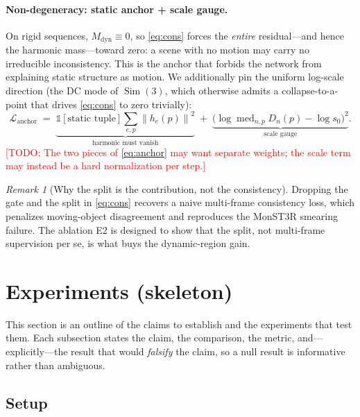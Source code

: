 \documentclass{article}
\DeclareMathOperator{\Sim}{Sim}
\newcommand{\norm}[1]{\left\lVert #1 \right\rVert}
\newcommand{\Mdyn}{M_{\mathrm{dyn}}}
\newcommand{\Lanchor}{\mathcal{L}_{\mathrm{anchor}}}
\newcommand{\todo}[1]{\textcolor{red}{[TODO: #1]}}
\theoremstyle{definition}
\theoremstyle{plain}
\theoremstyle{remark}
\newtheorem{remark}{Remark}
\begin{document}
\paragraph{Non-degeneracy: static anchor + scale gauge.}
On rigid sequences, $\Mdyn\equiv 0$, so \eqref{eq:cons} forces the
\emph{entire} residual---and hence the harmonic mass---toward zero: a
scene with no motion may carry no irreducible inconsistency. This is the
anchor that forbids the network from explaining static structure as
motion. We additionally pin the uniform log-scale direction (the DC mode
of $\Sim(3)$, which otherwise admits a collapse-to-a-point that drives
\eqref{eq:cons} to zero trivially):
\begin{equation}
  \Lanchor
  \;=\;
  \underbrace{\mathbb{1}[\text{static tuple}]\sum_{e,p}\norm{h_e(p)}^2}_{\text{harmonic must vanish}}
  \;+\;
  \underbrace{\big(\log\textstyle\operatorname{med}_{n,p}D_n(p)-\log s_0\big)^2}_{\text{scale gauge}} .
  \label{eq:anchor}
\end{equation}
\todo{The two pieces of \eqref{eq:anchor} may want separate weights; the
scale term may instead be a hard normalization per step.}

\begin{remark}[Why the split is the contribution, not the consistency]
Dropping the gate and the split in \eqref{eq:cons} recovers a naive
multi-frame consistency loss, which penalizes moving-object disagreement
and reproduces the MonST3R smearing failure. The ablation E2 is designed
to show that the split, not multi-frame supervision per se, is what
buys the dynamic-region gain.
\end{remark}

\section{Experiments (skeleton)}
\label{sec:experiments}

This section is an outline of the claims to establish and the experiments
that test them. Each subsection states the claim, the comparison, the
metric, and---explicitly---the result that would \emph{falsify} the claim,
so a null result is informative rather than ambiguous.

\subsection{Setup}
\label{sec:exp-setup}
\end{document}
